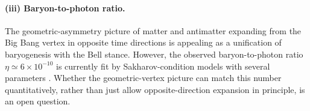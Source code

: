 \paragraph{(iii) Baryon-to-photon ratio.}
The geometric-asymmetry picture of matter and antimatter expanding from the Big Bang vertex in opposite time directions is appealing as a unification of baryogenesis with the Bell stance.
However, the observed baryon-to-photon ratio $\eta\simeq 6\times 10^{-10}$ is currently fit by Sakharov-condition models with several parameters \citep{Sakharov1967CPviolation,Riotto1999BaryogenesisReview}.
Whether the geometric-vertex picture can match this number quantitatively, rather than just allow opposite-direction expansion in principle, is an open question.
